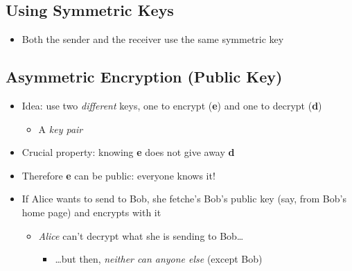 \subsection{Using Symmetric Keys}
\begin{itemize}[nosep]
    \item Both the sender and the receiver use the same symmetric key
\end{itemize}
\begin{figure}[H]
\end{figure}

\subsection{Asymmetric Encryption (Public Key)}
\begin{itemize}[nosep]
    \item Idea: use two \emph{different} keys, one to encrypt (\textbf{e}) and one to decrypt (\textbf{d})
          \begin{itemize}[nosep]
              \item A \emph{key pair}
          \end{itemize}
    \item Crucial property: knowing \textbf{e} does not give away \textbf{d}
    \item Therefore \textbf{e} can be public: everyone knows it!
    \item If Alice wants to send to Bob, she fetche's Bob's public key (say, from Bob's home page) and encrypts with it
          \begin{itemize}[nosep]
              \item \emph{Alice} can't decrypt what she is sending to Bob\dots
                    \begin{itemize}[nosep]
                        \item \dots but then, \emph{neither can anyone else} (except Bob)
                    \end{itemize}
          \end{itemize}
\end{itemize}

